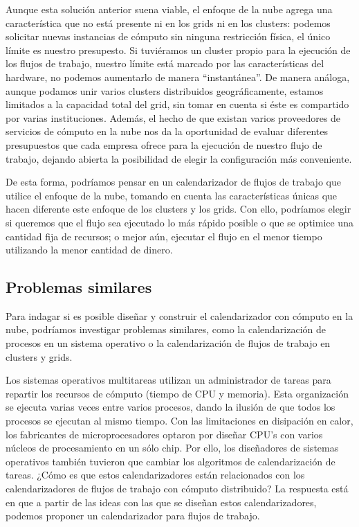 \documentclass[letterpaper]{report}
\begin{document}
Aunque esta solución anterior suena viable, el enfoque de la nube agrega una característica que no está presente ni en los grids ni en los clusters: podemos solicitar nuevas instancias de cómputo sin ninguna restricción física, el único límite es nuestro presupesto. Si tuviéramos un cluster propio para la ejecución de los flujos de trabajo, nuestro límite está marcado por las características del hardware, no podemos aumentarlo de manera ``instantánea''. De manera análoga, aunque podamos unir varios clusters distribuidos geográficamente, estamos limitados a la capacidad total del grid, sin tomar en cuenta si éste es compartido por varias instituciones. Además, el hecho de que existan varios proveedores de servicios de cómputo en la nube nos da la oportunidad de evaluar diferentes presupuestos que cada empresa ofrece para la ejecución de nuestro flujo de trabajo, dejando abierta la posibilidad de elegir la configuración más conveniente.

De esta forma, podríamos pensar en un calendarizador de flujos de trabajo que utilice el enfoque de la nube, tomando en cuenta las características únicas que hacen diferente este enfoque de los clusters y los grids. Con ello, podríamos elegir si queremos que el flujo sea ejecutado lo más rápido posible o que se optimice una cantidad fija de recursos; o mejor aún, ejecutar el flujo en el menor tiempo utilizando la menor cantidad de dinero.


\subsection*{Problemas similares}

Para indagar si es posible diseñar y construir el calendarizador con cómputo en la nube, podríamos investigar problemas similares, como la calendarización de procesos en un sistema operativo o la calendarización de flujos de trabajo en clusters y grids.

Los sistemas operativos multitareas utilizan un administrador de tareas para repartir los recursos de cómputo (tiempo de CPU y memoria). Esta organización se ejecuta varias veces entre varios procesos, dando la ilusión de que todos los procesos se ejecutan al mismo tiempo. Con las limitaciones en disipación en calor, los fabricantes de microprocesadores optaron por diseñar CPU's con varios núcleos de procesamiento en un sólo chip. Por ello, los diseñadores de sistemas operativos también tuvieron que cambiar los algoritmos de calendarización de tareas. ¿Cómo es que estos calendarizadores están relacionados con los calendarizadores de flujos de trabajo con cómputo distribuido? La respuesta está en que a partir de las ideas con las que se diseñan estos calendarizadores, podemos proponer un calendarizador para flujos de trabajo.
\end{document}
